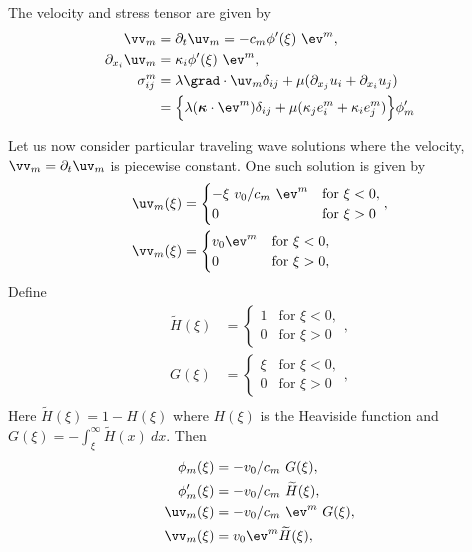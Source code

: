 The velocity and stress tensor are given by 
\begin{align*}
  \vv_m &= \partial_t \uv_m = -c_m \phi'(\xi)~\ev^m, \\
  \partial_{x_i} \uv_m &= \kappa_i \phi'(\xi)~\ev^m, \\
  \sigma_{ij}^m &= \lambda \grad\cdot\uv_m \delta_{ij} + \mu (\partial_{x_j} u_i + \partial_{x_i} u_j ) \\
    &= \Big\{ \lambda( \kappav\cdot\ev^m)\delta_{ij} + \mu( \kappa_j e^m_i + \kappa_i e^m_j )\Big\} \phi_m'
\end{align*}

Let us now consider particular traveling wave solutions where the 
velocity, $\vv_m=\partial_t \uv_m$ is piecewise constant. One such solution is given by 
\begin{align*}
  \uv_m (\xi)  &= \begin{cases}  -\xi ~v_0/c_m~\ev^m  & \mbox{for $\xi<0$}, \\
                                 0  & \mbox{for $\xi>0$}  \end{cases}, \\
  \vv_m (\xi)  &= \begin{cases}  v_0\ev^m  & \mbox{for $\xi<0$}, \\
                                 0  & \mbox{for $\xi>0$},\end{cases}
\end{align*}
\newcommand{\Ht}{\widetilde{H}}
Define
\begin{align*}
  \Ht(\xi) &= \begin{cases}  1  & \mbox{for $\xi<0$}, \\
                             0 & \mbox{for $\xi>0$} \end{cases}, \\
  G(\xi) &= \begin{cases}  \xi & \mbox{for $\xi<0$}, \\
                          0  & \mbox{for $\xi>0$} \end{cases}, \\
\end{align*}
Here $\Ht(\xi)=1-H(\xi)$ where $H(\xi)$ is the Heaviside function and $G(\xi)=-\int_\xi^{\infty} \Ht(x)~dx$.
Then
\begin{align*}
  \phi_m(\xi) &= -v_0/c_m~G(\xi), \\
  \phi_m'(\xi) &= -v_0/c_m~\Ht(\xi), \\
  \uv_m (\xi)  &= -v_0/c_m~\ev^m~G(\xi), \\
  \vv_m (\xi)  &=  v_0\ev^m \Ht(\xi), 
\end{align*}
